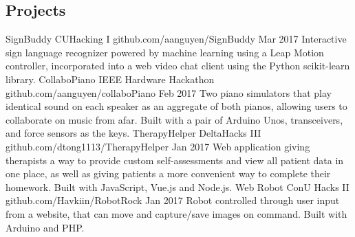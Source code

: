 \documentclass[]{aanguyen_cv}
\begin{document}
\begin{main}
		\section{Projects}
			\mainentry%
				{SignBuddy {\faGithub}}%
				{CUHacking I}%
				{github.com/aanguyen/SignBuddy}%
				{Mar 2017}%
				{Interactive sign language recognizer powered by machine learning using a Leap Motion controller, incorporated into a web video chat client using the Python scikit-learn library.}
			\mainentry%
				{CollaboPiano {\faGithub}}%
				{IEEE Hardware Hackathon}%
				{github.com/aanguyen/collaboPiano}%
				{Feb 2017}%
				{Two piano simulators that play identical sound on each speaker as an aggregate of both pianos, allowing users to collaborate on music from afar. Built with a pair of Arduino Unos, transceivers, and force sensors as the keys.}
			\mainentry%
				{TherapyHelper {\faGithub}}%
				{DeltaHacks III}%
				{github.com/dtong1113/TherapyHelper}%
				{Jan 2017}%
				{Web application giving therapists a way to provide custom self-assessments and view all patient data in one place, as well as giving patients a more convenient way to complete their homework. Built with JavaScript, Vue.js and Node.js.}
			\mainentry%
				{Web Robot {\faGithub}}%
				{ConU Hacks II}%
				{github.com/Havkiin/RobotRock}%
				{Jan 2017}%
				{Robot controlled through user input from a website, that can move and capture/save images on command. Built with Arduino and PHP.}%
			\vspace{0.65cm}%
	\end{main}%
\end{document}
